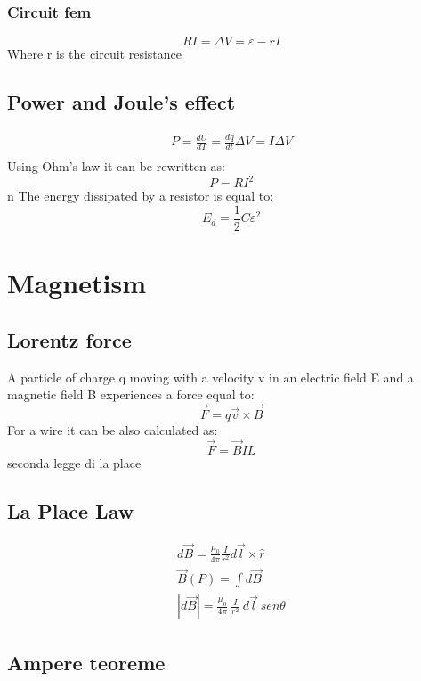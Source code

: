 \documentclass[Master.tex]{subfiles}
\begin{document}
\begin{multicols}{2}
				   \subsubsection{Circuit fem}
						    \[
								     RI = \Delta V = \varepsilon -rI
						    \]
						    Where r is the circuit resistance

		  \subsection{Power and Joule's effect}
				   \begin{gather*}
						    P = \frac{dU}{dT} = \frac{dq}{dt} \Delta V = I \Delta V \\
				   \end{gather*}
				   Using Ohm's law it can be rewritten as:
				   \[
						    P = R I^2
				   \] n The energy dissipated by a resistor is equal to:
				   \[
						    E_{d}  = \frac{1}{2}C \varepsilon ^2
				   \]

		 \section{Magnetism}

		  \subsection{Lorentz force}
				   A particle of charge q moving with a velocity v in an electric field E and a
				   magnetic field B experiences a force equal to:
				   \[
						    \vec{F}  =q \vec{v}  \times \vec{B}
				   \]
				   For a wire it can be also calculated as:
				   \[
						    \vec{F} = \vec{B} I L
				   \]
				   seconda legge di la place

		  \subsection{La Place Law}
				   \begin{gather*}
						    d\vec{B} = \frac{\mu_{0}}{4 \pi } \frac{I}{r^2} d\vec{l} \times \hat{r} \\
						    \vec{B}(P) = \int d\vec{B}\\
						    |d\vec{B}| = \frac{\mu _{0} }{4\pi} ~\frac{I}{r^2}~d\vec{l}~ sen \theta
				   \end{gather*}

		  \subsection{Ampere teoreme}

\end{multicols}
\end{document}
